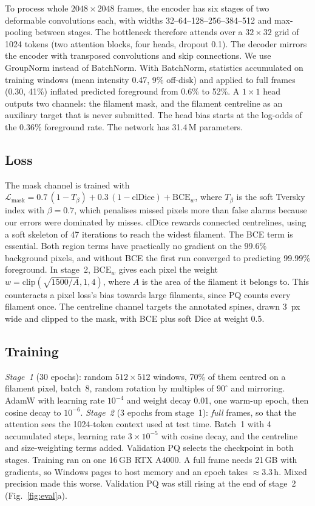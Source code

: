 \documentclass[sigconf]{acmart}
\begin{document}
To process whole $2048\times2048$ frames, the encoder has six stages of two deformable convolutions each, with widths 32--64--128--256--384--512 and max-pooling between stages. The bottleneck therefore attends over a $32\times32$ grid of 1024 tokens (two attention blocks, four heads, dropout 0.1). The decoder mirrors the encoder with transposed convolutions and skip connections. We use GroupNorm \cite{wu2018group} instead of BatchNorm. With BatchNorm, statistics accumulated on training windows (mean intensity 0.47, 9\% off-disk) and applied to full frames (0.30, 41\%) inflated predicted foreground from 0.6\% to 52\%. A $1\times1$ head outputs two channels: the filament mask, and the filament centreline as an auxiliary target that is never submitted. The head bias starts at the log-odds of the 0.36\% foreground rate. The network has 31.4\,M parameters.

\subsection{Loss}
The mask channel is trained with
$\mathcal{L}_{\mathrm{mask}} = 0.7\,(1-T_{\beta}) + 0.3\,(1-\mathrm{clDice}) + \mathrm{BCE}_w$,
where $T_{\beta}$ is the soft Tversky index \cite{salehi2017tversky} with $\beta=0.7$, which penalises missed pixels more than false alarms because our errors were dominated by misses. clDice \cite{shit2021cldice} rewards connected centrelines, using a soft skeleton of 47 iterations to reach the widest filament. The BCE term is essential. Both region terms have practically no gradient on the 99.6\% background pixels, and without BCE the first run converged to predicting 99.99\% foreground. In stage~2, $\mathrm{BCE}_w$ gives each pixel the weight $w=\mathrm{clip}(\sqrt{1500/A},1,4)$, where $A$ is the area of the filament it belongs to. This counteracts a pixel loss's bias towards large filaments, since PQ counts every filament once. The centreline channel targets the annotated spines, drawn 3~px wide and clipped to the mask, with BCE plus soft Dice at weight 0.5.

\subsection{Training}
\emph{Stage~1} (30 epochs): random $512\times512$ windows, 70\% of them centred on a filament pixel, batch~8, random rotation by multiples of $90^\circ$ and mirroring. AdamW \cite{loshchilov2019adamw} with learning rate $10^{-4}$ and weight decay 0.01, one warm-up epoch, then cosine decay \cite{loshchilov2017sgdr} to $10^{-6}$.
\emph{Stage~2} (3 epochs from stage~1): \emph{full} frames, so that the attention sees the 1024-token context used at test time. Batch~1 with 4 accumulated steps, learning rate $3\times10^{-5}$ with cosine decay, and the centreline and size-weighting terms added.
Validation PQ selects the checkpoint in both stages. Training ran on one 16\,GB RTX A4000. A full frame needs 21\,GB with gradients, so Windows pages to host memory and an epoch takes $\approx$3.3\,h. Mixed precision made this worse. Validation PQ was still rising at the end of stage~2 (Fig.~\ref{fig:eval}a).
\end{document}

